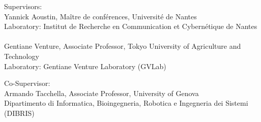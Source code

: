 \begin{titlepage}
	\noindent Supervisors:
	\\
	\noindent Yannick Aoustin, Ma\^{i}tre de conf\'{e}rences, Universit\'{e} de Nantes
	\\
	\noindent Laboratory: Institut de Recherche en Communication et Cybern\'{e}tique de Nantes\\
	\\				
	\noindent Gentiane Venture, Associate Professor, Tokyo University of Agriculture and Technology
	\\
	\noindent Laboratory: Gentiane Venture Laboratory (GVLab)
	\par
	\noindent Co-Supervisor:
	\\
	\noindent Armando Tacchella, Associate Professor, University of Genova
	\\
	\noindent Dipartimento di Informatica, Bioingegneria, Robotica e Ingegneria dei Sistemi (DIBRIS) \\
\end{titlepage}